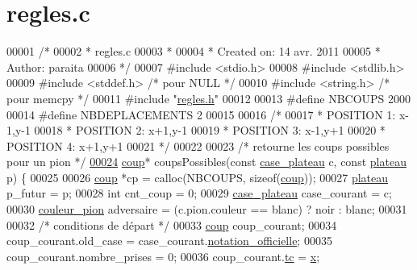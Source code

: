 \hypertarget{regles_8c_source}{
\section{regles.c}
}

\begin{DoxyCode}
00001 \textcolor{comment}{/*}
00002 \textcolor{comment}{ * regles.c}
00003 \textcolor{comment}{ *}
00004 \textcolor{comment}{ *  Created on: 14 avr. 2011}
00005 \textcolor{comment}{ *      Author: paraita}
00006 \textcolor{comment}{ */}
00007 \textcolor{preprocessor}{#include <stdio.h>}
00008 \textcolor{preprocessor}{#include <stdlib.h>}
00009 \textcolor{preprocessor}{#include <stddef.h>} \textcolor{comment}{/* pour NULL */}
00010 \textcolor{preprocessor}{#include <string.h>} \textcolor{comment}{/* pour memcpy */}
00011 \textcolor{preprocessor}{#include "\hyperlink{regles_8h}{regles.h}"}
00012 
00013 \textcolor{preprocessor}{#define NBCOUPS 2000}
00014 \textcolor{preprocessor}{}\textcolor{preprocessor}{#define NBDEPLACEMENTS 2}
00015 \textcolor{preprocessor}{}
00016 \textcolor{comment}{/*}
00017 \textcolor{comment}{ * POSITION 1: x-1,y-1}
00018 \textcolor{comment}{ * POSITION 2: x+1,y-1}
00019 \textcolor{comment}{ * POSITION 3: x-1,y+1}
00020 \textcolor{comment}{ * POSITION 4: x+1,y+1}
00021 \textcolor{comment}{ */}
00022 
00023 \textcolor{comment}{/* retourne les coups possibles pour un pion */}
\hypertarget{regles_8c_source_l00024}{}\hyperlink{regles_8h_a96d861d76d7070b120ca385c13aad984}{00024} \hyperlink{structcoup}{coup}* coupsPossibles(\textcolor{keyword}{const} \hyperlink{structcase__plateau}{case_plateau} c, \textcolor{keyword}{const} \hyperlink{structplateau}{plateau} p) \{
00025 
00026         \hyperlink{structcoup}{coup} *cp = calloc(NBCOUPS, \textcolor{keyword}{sizeof}(\hyperlink{structcoup}{coup}));
00027         \hyperlink{structplateau}{plateau} p\_futur = p;
00028         \textcolor{keywordtype}{int} cnt\_coup = 0;
00029         \hyperlink{structcase__plateau}{case_plateau} case\_courant = c;
00030         \hyperlink{plateau_8h_a8282be6127518547fa916dd6cfef17cb}{couleur_pion} adversaire = (c.pion.couleur == blanc) ? noir : blanc;
00031 
00032         \textcolor{comment}{/* conditions de départ */}
00033         \hyperlink{structcoup}{coup} coup\_courant;
00034         coup\_courant.old\_case = case\_courant.\hyperlink{structcase__plateau_ad510581b324604a9cf685cbb769a421a}{notation_officielle};
00035         coup\_courant.nombre\_prises = 0;
00036         coup\_courant.\hyperlink{structcoup_aa33da004dccb192cb33bc00c26c6e859}{tc} = \hyperlink{plateau_8h_a9e00f85b4b6ec2d8bdfbe94ff40f0eeeacab1e15e82c5976bfb476ddfe145263c}{x};

\end{DoxyCode}
